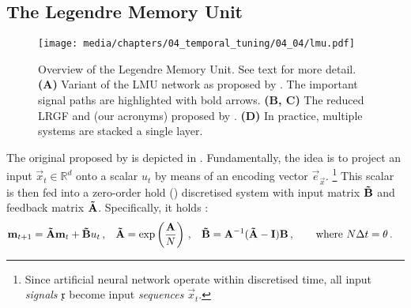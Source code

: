 

\subsection{The Legendre Memory Unit}
\label{sec:lmu}

\begin{figure}[p]
	\centering
	\texttt{[image: media/chapters/04\_temporal\_tuning/04\_04/lmu.pdf]}%
	{\label{fig:lmu_a}}%
	{\label{fig:lmu_b}}%
	{\label{fig:lmu_c}}%
	{\label{fig:lmu_d}}%
	\caption[Overview of the Legendre Memory Unit]{Overview of the Legendre Memory Unit. See text for more detail. \textbf{(A)} Variant of the LMU network as proposed by \citet{voelker2019lmu}. The important signal paths are highlighted with bold arrows.
	\textbf{(B, C)} The reduced LRGF and \FIR \LMU (our acronyms) proposed by \citet{chilkuri2021parallelizing}. \textbf{(D)} In practice, multiple \LDN systems are stacked a single layer.}
\end{figure}

The original \LMU proposed by \citet{voelker2019lmu} is depicted in .
Fundamentally, the idea is to project an input $\vec x_t \in \mathbb{R}^d$ onto a scalar $u_t$ by means of an encoding vector $\vec e_{\vec x}$.%
\footnote{Since artificial neural network operate within discretised time, all input \emph{signals} $\mathfrak{x}$ become input \emph{sequences} ${\vec x}_t$.}
This scalar is then fed into a zero-order hold (\ZOH) discretised \LDN system with input matrix $\mathbf{\tilde B}$ and feedback matrix $\mathbf{\tilde A}$.
Specifically, it holds \citep[e.g.,][Section~9.8]{brogan1991modern}:
\begin{align}
	\mathbf{m}_{t + 1} &= \mathbf{\tilde A} \mathbf{m}_t + \mathbf{\tilde B} u_t \,,
	& \mathbf{\tilde A} &= \exp\left(\frac{\mathbf{A}}{N}\right) \,,
	& \mathbf{\tilde B} &= {\mathbf{A}}^{-1} (\mathbf{\tilde A} - \mathbf{I}) \mathbf{B} \,,
	\quad\quad \text{where } N \Delta t = \theta \,.
	\label{eqn:ldn_discretisation}
\end{align}

